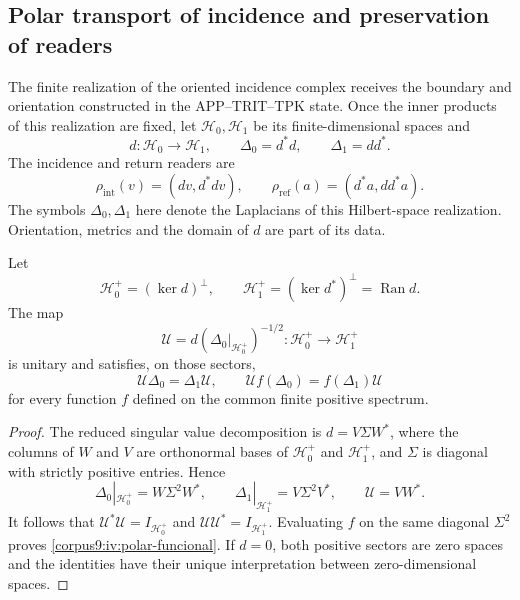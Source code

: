 \subsection{Polar transport of incidence and preservation of readers}
\label{corpus9:iv:polar}

The finite realization of the oriented incidence complex
receives the boundary and orientation constructed in the
APP--TRIT--TPK state. Once the inner products of
this realization are fixed, let \(\mathcal H_0,\mathcal H_1\)
be its finite-dimensional spaces and
\[
 d:\mathcal H_0\longrightarrow\mathcal H_1,\qquad
 \Delta_0=d^*d,\qquad \Delta_1=dd^*.
\]
The incidence and return readers are
\[
 \rho_{\mathrm{int}}(v)=(dv,d^*dv),\qquad
 \rho_{\mathrm{ref}}(a)=(d^*a,dd^*a).
\]
The symbols \(\Delta_0,\Delta_1\) here denote the
Laplacians of this Hilbert-space realization. Orientation,
metrics and the domain of \(d\) are part of its data.

\begin{proposition}
\label{corpus9:iv:polar-transporte}
Let
\[
 \mathcal H_0^+=(\ker d)^\perp,\qquad
 \mathcal H_1^+=(\ker d^*)^\perp=\operatorname{Ran}d.
\]
The map
\begin{equation}
 \mathcal U=d(\Delta_0|_{\mathcal H_0^+})^{-1/2}
    :\mathcal H_0^+\longrightarrow\mathcal H_1^+
 \label{corpus9:iv:polar-operador}
\end{equation}
is unitary and satisfies, on those sectors,
\begin{equation}
 \mathcal U\Delta_0=\Delta_1\mathcal U,\qquad
 \mathcal U f(\Delta_0)=f(\Delta_1)\mathcal U
 \label{corpus9:iv:polar-funcional}
\end{equation}
for every function \(f\) defined on the common finite
positive spectrum.
\end{proposition}
\begin{proof}
The reduced singular value decomposition is \(d=V\Sigma W^*\),
where the columns of \(W\) and \(V\) are orthonormal bases
of \(\mathcal H_0^+\) and \(\mathcal H_1^+\), and \(\Sigma\)
is diagonal with strictly positive entries. Hence
\[
 \Delta_0|_{\mathcal H_0^+}=W\Sigma^2W^*,\qquad
 \Delta_1|_{\mathcal H_1^+}=V\Sigma^2V^*,\qquad
 \mathcal U=VW^*.
\]
It follows that \(\mathcal U^*\mathcal U=I_{\mathcal H_0^+}\) and
\(\mathcal U\mathcal U^*=I_{\mathcal H_1^+}\). Evaluating \(f\)
on the same diagonal \(\Sigma^2\) proves
\eqref{corpus9:iv:polar-funcional}. If \(d=0\), both
positive sectors are zero spaces and the identities have
their unique interpretation between zero-dimensional spaces.
\end{proof}

